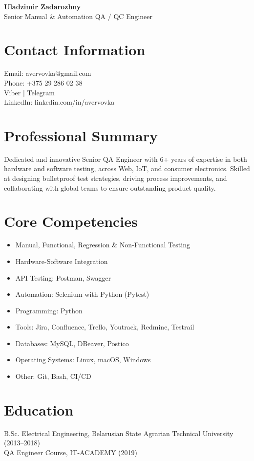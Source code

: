 \documentclass[11pt,a4paper]{article}
\begin{document}
\begin{center}
  {\Large \textbf{Uladzimir Zadarozhny}}\\[0.2cm]
  Senior Manual \& Automation QA / QC Engineer
\end{center}

\section*{Contact Information}
Email: avervovka@gmail.com \\
Phone: +375 29 286 02 38 \\
Viber | Telegram \\
LinkedIn: linkedin.com/in/avervovka

\section*{Professional Summary}
Dedicated and innovative Senior QA Engineer with 6+ years of expertise in both hardware and software testing, across Web, IoT, and consumer electronics. Skilled at designing bulletproof test strategies, driving process improvements, and collaborating with global teams to ensure outstanding product quality.

\section*{Core Competencies}
\begin{itemize}
  \item Manual, Functional, Regression \& Non-Functional Testing
  \item Hardware-Software Integration
  \item API Testing: Postman, Swagger
  \item Automation: Selenium with Python (Pytest)
  \item Programming: Python
  \item Tools: Jira, Confluence, Trello, Youtrack, Redmine, Testrail
  \item Databases: MySQL, DBeaver, Postico
  \item Operating Systems: Linux, macOS, Windows
  \item Other: Git, Bash, CI/CD
\end{itemize}

\section*{Education}
B.Sc. Electrical Engineering, Belarusian State Agrarian Technical University (2013--2018) \\
QA Engineer Course, IT-ACADEMY (2019)
\end{document}
